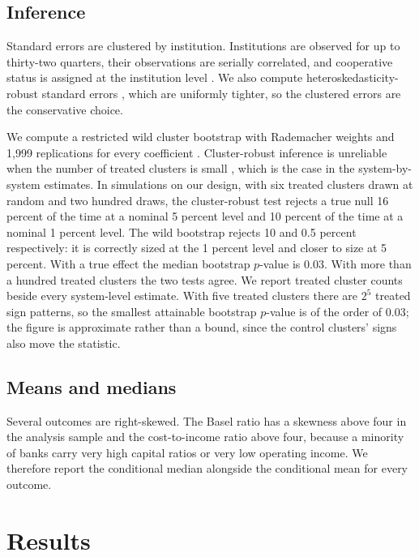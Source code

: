 \documentclass[11pt,a4paper]{article}
\begin{document}
\subsection{Inference}
\label{sec:inference}

Standard errors are clustered by institution. Institutions are observed for up to
thirty-two quarters, their observations are serially correlated, and cooperative status
is assigned at the institution level \citep{cameron2015, abadie2023}. We also compute
heteroskedasticity-robust standard errors \citep{mackinnon1985}, which are uniformly
tighter, so the clustered errors are the conservative choice.

We compute a restricted wild cluster bootstrap with Rademacher weights and 1{,}999
replications for every coefficient \citep{cameron2008}. Cluster-robust inference is
unreliable when the number of treated clusters is small \citep{mackinnon2017}, which is
the case in the system-by-system estimates. In simulations on our design, with six
treated clusters drawn at random and two hundred draws, the cluster-robust test rejects a
true null 16 percent of the time at a nominal 5 percent level and 10 percent of the time
at a nominal 1 percent level. The wild bootstrap rejects 10 and 0.5 percent
respectively: it is correctly sized at the 1 percent level and closer to size at 5
percent. With a true effect the median bootstrap $p$-value is 0.03. With more than a
hundred treated clusters the two tests agree. We report treated cluster counts beside
every system-level estimate. With five treated clusters there are $2^5$ treated sign
patterns, so the smallest attainable bootstrap $p$-value is of the order of 0.03; the
figure is approximate rather than a bound, since the control clusters' signs also move
the statistic.

\subsection{Means and medians}

Several outcomes are right-skewed. The Basel ratio has a skewness above four in the
analysis sample and the cost-to-income ratio above four, because a minority of banks
carry very high capital ratios or very low operating income. We therefore report the
conditional median alongside the conditional mean for every outcome.

\section{Results}
\label{sec:results}
\end{document}
